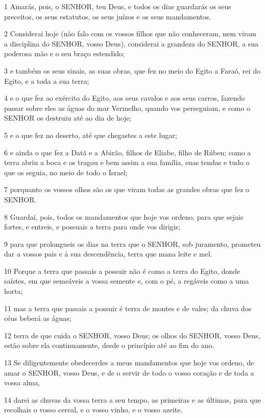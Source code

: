 \par 1 Amarás, pois, o SENHOR, teu Deus, e todos os dias guardarás os seus preceitos, os seus estatutos, os seus juízos e os seus mandamentos.
\par 2 Considerai hoje (não falo com os vossos filhos que não conheceram, nem viram a disciplina do SENHOR, vosso Deus), considerai a grandeza do SENHOR, a sua poderosa mão e o seu braço estendido;
\par 3 e também os seus sinais, as suas obras, que fez no meio do Egito a Faraó, rei do Egito, e a toda a sua terra;
\par 4 e o que fez ao exército do Egito, aos seus cavalos e aos seus carros, fazendo passar sobre eles as águas do mar Vermelho, quando vos perseguiam, e como o SENHOR os destruiu até ao dia de hoje;
\par 5 e o que fez no deserto, até que chegastes a este lugar;
\par 6 e ainda o que fez a Datã e a Abirão, filhos de Eliabe, filho de Rúben; como a terra abriu a boca e os tragou e bem assim a sua família, suas tendas e tudo o que os seguia, no meio de todo o Israel;
\par 7 porquanto os vossos olhos são os que viram todas as grandes obras que fez o SENHOR.
\par 8 Guardai, pois, todos os mandamentos que hoje vos ordeno, para que sejais fortes, e entreis, e possuais a terra para onde vos dirigis;
\par 9 para que prolongueis os dias na terra que o SENHOR, sob juramento, prometeu dar a vossos pais e à sua descendência, terra que mana leite e mel.
\par 10 Porque a terra que passais a possuir não é como a terra do Egito, donde saístes, em que semeáveis a vossa semente e, com o pé, a regáveis como a uma horta;
\par 11 mas a terra que passais a possuir é terra de montes e de vales; da chuva dos céus beberá as águas;
\par 12 terra de que cuida o SENHOR, vosso Deus; os olhos do SENHOR, vosso Deus, estão sobre ela continuamente, desde o princípio até ao fim do ano.
\par 13 Se diligentemente obedecerdes a meus mandamentos que hoje vos ordeno, de amar o SENHOR, vosso Deus, e de o servir de todo o vosso coração e de toda a vossa alma,
\par 14 darei as chuvas da vossa terra a seu tempo, as primeiras e as últimas, para que recolhais o vosso cereal, e o vosso vinho, e o vosso azeite.
